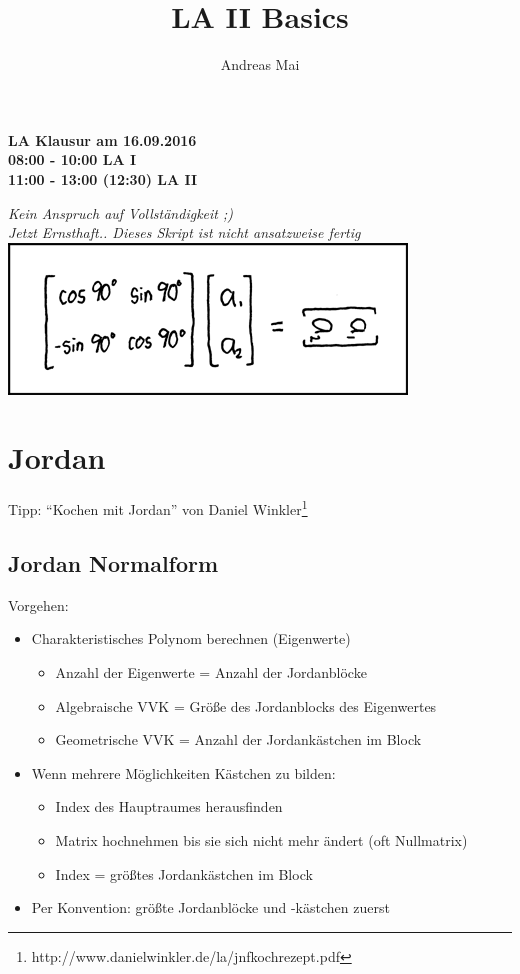 \documentclass[a4paper,portrait]{scrartcl}
\author{Andreas Mai}
\title{LA II Basics}
\begin{document}
\maketitle
\begin{center}
\textbf{LA Klausur am 16.09.2016} \\
\textbf{08:00 - 10:00 LA I} \\
\textbf{11:00 - 13:00 (12:30) LA II} 
\end{center}

\begin{center}
\textit{Kein Anspruch auf Vollständigkeit ;)} \\
\textit{Jetzt Ernsthaft.. Dieses Skript ist nicht ansatzweise fertig} \\
\includegraphics{matrix_transform.png}

\end{center}
\clearpage
\tableofcontents
\clearpage
\setcounter{page}{1}
\section{Jordan}
Tipp: \enquote{Kochen mit Jordan} von Daniel Winkler\footnote{http://www.danielwinkler.de/la/jnfkochrezept.pdf}
\subsection{Jordan Normalform}
Vorgehen:
\begin{itemize}
	\item Charakteristisches Polynom berechnen (Eigenwerte)
	\begin{itemize}
		\item Anzahl der Eigenwerte = Anzahl der Jordanblöcke
		\item Algebraische VVK = Größe des Jordanblocks des Eigenwertes
		\item Geometrische VVK = Anzahl der Jordankästchen im Block
	\end{itemize}
	\item Wenn mehrere Möglichkeiten Kästchen zu bilden:
	\begin{itemize}
		\item Index des Hauptraumes herausfinden
		\item Matrix hochnehmen bis sie sich nicht mehr ändert (oft Nullmatrix)
		\item Index = größtes Jordankästchen im Block
	\end{itemize}
	\item Per Konvention: größte Jordanblöcke und -kästchen zuerst
\end{itemize}
\end{document}

